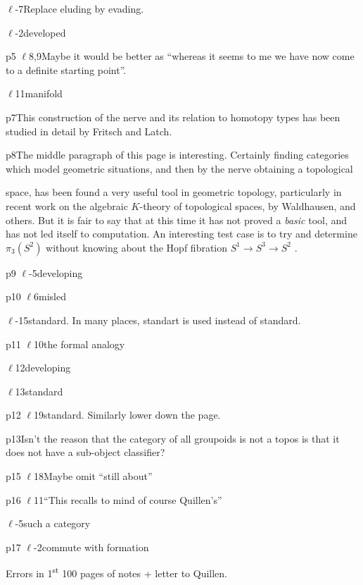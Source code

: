 $\ell$-7\qquad Replace eluding by evading.

$\ell$-2\qquad developed

p5 $\ell$8,9\quad Maybe it would be better as ``whereas it seems to me we have now come to a definite starting point''.

$\ell$11\qquad manifold

p7\qquad This construction of the nerve and its relation to homotopy types has been studied in detail by Fritsch and Latch.

p8\qquad The middle paragraph of this page is interesting. Certainly finding categories which model geometric situations, and then by the nerve obtaining a topological

space, has been found a very useful tool in geometric topology, particularly in recent work on the algebraic $K$-theory of topological spaces, by Waldhausen, and others. But it is fair to say that at this time it has not proved a \textit{basic} tool, and has not led itself to computation. An interesting test case is to try and determine $\pi_{3}(S^{2})$ without knowing about the Hopf fibration $S^{1}\to S^{3}\to S^{2}$ .

p9 $\ell$-5\qquad developing

p10 $\ell$6\qquad misled

$\ell$-15\quad standard. In many places, standart is used instead of standard.

p11 $\ell$10\quad the formal analogy

$\ell$12\qquad developing

$\ell$13\qquad standard

p12 $\ell$19\quad standard. Similarly lower down the page.

p13\qquad Isn't the reason that the category of all groupoids is not a topos is that it does not have a sub-object classifier?

p15 $\ell$18\quad Maybe omit ``still about''

p16 $\ell$11\quad ``This recalls to mind of course Quillen's''

$\ell$-5\qquad such a category

p17 $\ell$-2\quad commute with formation


\begin{center}Errors in 1\textsuperscript{st} 100 pages of notes + letter to Quillen.\end{center}

